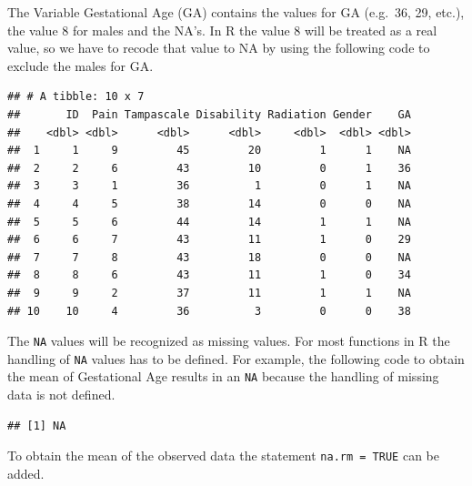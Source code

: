 \documentclass[]{book}
\newenvironment{Shaded}{\begin{snugshade}}{\end{snugshade}}
\newcommand{\KeywordTok}[1]{\textcolor[rgb]{0.13,0.29,0.53}{\textbf{#1}}}
\newcommand{\DecValTok}[1]{\textcolor[rgb]{0.00,0.00,0.81}{#1}}
\newcommand{\StringTok}[1]{\textcolor[rgb]{0.31,0.60,0.02}{#1}}
\newcommand{\OtherTok}[1]{\textcolor[rgb]{0.56,0.35,0.01}{#1}}
\newcommand{\OperatorTok}[1]{\textcolor[rgb]{0.81,0.36,0.00}{\textbf{#1}}}
\newcommand{\NormalTok}[1]{#1}
\begin{document}
The Variable Gestational Age (GA) contains the values for GA (e.g.~36,
29, etc.), the value 8 for males and the NA's. In R the value 8 will be
treated as a real value, so we have to recode that value to NA by using
the following code to exclude the males for GA.

\begin{Shaded}
\end{Shaded}

\begin{verbatim}
## # A tibble: 10 x 7
##       ID  Pain Tampascale Disability Radiation Gender    GA
##    <dbl> <dbl>      <dbl>      <dbl>     <dbl>  <dbl> <dbl>
##  1     1     9         45         20         1      1    NA
##  2     2     6         43         10         0      1    36
##  3     3     1         36          1         0      1    NA
##  4     4     5         38         14         0      0    NA
##  5     5     6         44         14         1      1    NA
##  6     6     7         43         11         1      0    29
##  7     7     8         43         18         0      0    NA
##  8     8     6         43         11         1      0    34
##  9     9     2         37         11         1      1    NA
## 10    10     4         36          3         0      0    38
\end{verbatim}

The \texttt{NA} values will be recognized as missing values. For most
functions in R the handling of \texttt{NA} values has to be defined. For
example, the following code to obtain the mean of Gestational Age
results in an \texttt{NA} because the handling of missing data is not
defined.

\begin{Shaded}
\end{Shaded}

\begin{verbatim}
## [1] NA
\end{verbatim}

To obtain the mean of the observed data the statement
\texttt{na.rm\ =\ TRUE} can be added.
\end{document}
